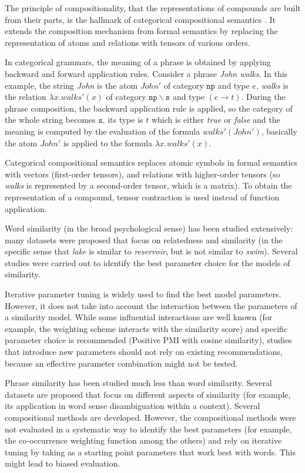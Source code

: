 The principle of compositionality, that the representations of compounds are built from their parts, is the hallmark of categorical compositional semantics \cite{DBLP:journals/corr/abs-1003-4394}. It extends the composition mechanism from formal semantics by replacing the representation of atoms and relations with tensors of various orders.

In categorical grammars, the meaning of a phrase is obtained by applying backward and forward application rules. Consider a phrase \textit{John walks}. In this example, the string \textit{John} is the atom $\mathit{John'}$ of category $\mathtt{np}$ and type $e$, \textit{walks} is the relation $\lambda x.\mathit{walks'}(x)$ of category $\mathtt{np\backslash{}s}$ and type $(e \to t)$. During the phrase composition, the backward application rule is applied, so the category of the whole string becomes $\mathtt{s}$, its type is $t$ which is either \textit{true} or \textit{false} and the meaning is computed by the evaluation of the formula $\mathit{walks'}(\mathit{John'})$, basically the atom $\mathit{John'}$ is applied to the formula $\lambda x.\mathit{walks'(x)}$.

Categorical compositional semantics replaces atomic symbols in formal semantics with vectors (first-order tensors), and relations with higher-order tensors (so \textit{walks} is represented by a second-order tensor, which is a matrix). To obtain the representation of a compound, tensor contraction is used instead of function application.

Word similarity (in the broad psychological sense) has been studied extensively: many datasets were proposed that focus on relatedness and similarity (in the specific sense that \textit{lake} is similar to \textit{reservoir}, but is not similar to \textit{swim}). Several studies were carried out to identify the best parameter choice for the models of similarity.

Iterative parameter tuning is widely used to find the best model parameters. However, it does not take into account the interaction between the parameters of a similarity model. While some influential interactions are well known (for example, the weighting scheme interacts with the similarity score) and specific parameter choice is recommended (Positive PMI with cosine similarity), studies that introduce new parameters should not rely on existing recommendations, because an effective parameter combination might not be tested.

Phrase similarity has been studied much less than word similarity. Several datasets  are proposed that focus on different aspects of similarity (for example, its application in word sense disambiguation within a context). Several compositional methods are developed. However, the compositional methods were not evaluated in a systematic way to identify the best parameters (for example, the co-occurrence weighting function among the others) and rely on iterative tuning by taking as a starting point parameters that work best with words. This might lead to biased evaluation.

